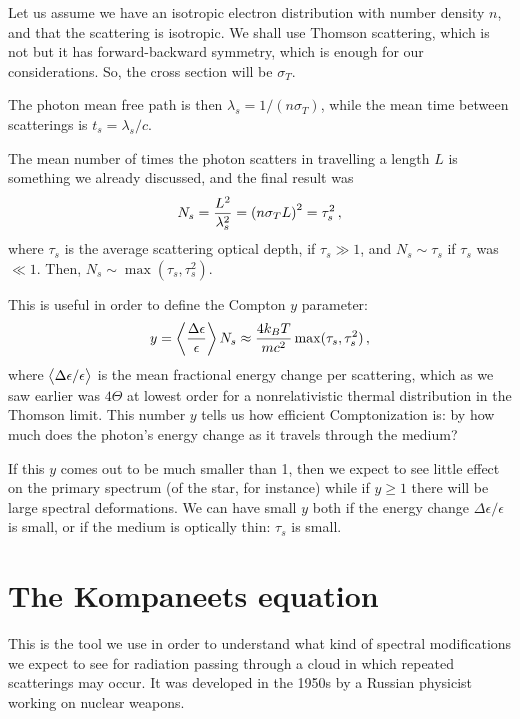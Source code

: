 \documentclass[main.tex]{subfiles}
\begin{document}
Let us assume we have an isotropic electron distribution with number density \(n\), and that the scattering is isotropic. We shall use Thomson scattering, which is not but it has forward-backward symmetry, which is enough for our considerations. So, the cross section will be \(\sigma _T\). 

The photon mean free path is then \(\lambda _s = 1 / (n \sigma _T)\), while the mean time between scatterings is \(t_s = \lambda _s / c\). 

The mean number of times the photon scatters in travelling a length \(L\) is something we already discussed, and the final result was 
%
\begin{align}
N_s = \frac{L^2}{\lambda _s^2} = \qty(n \sigma _T L)^2 = \tau _s^2
\,,
\end{align}
%
where \(\tau _s\) is the average scattering optical depth, if \(\tau _s \gg 1\), and \(N_s \sim \tau _s\) if \(\tau _s\) was \(\ll 1\). Then, \(N_s \sim \max (\tau _s, \tau _s^2)\). 

This is useful in order to define the Compton \(y\) parameter: 
%
\begin{align}
y = \expval{\frac{\Delta \epsilon }{\epsilon }} N_s \approx \frac{4 k_B T}{mc^2 } \max(\tau _s , \tau _s^2)
\,,
\end{align}
%
where \(\expval{\Delta \epsilon / \epsilon }\) is the mean fractional energy change per scattering, which as we saw earlier was \(4 \Theta \) at lowest order for a nonrelativistic thermal distribution in the Thomson  limit. 
This number \(y \) tells us how efficient Comptonization is: by how much does the photon's energy change as it travels through the medium?

If this \(y\) comes out to be much smaller than 1, then we expect to see little effect on the primary spectrum (of the star, for instance) while if \(y \geq 1\)  there will be large spectral deformations. 
We can have small \(y\) both if the energy change \(\Delta \epsilon / \epsilon \) is small, or if the medium is optically thin: \(\tau _s\) is small. 

\section{The Kompaneets equation}

This is the tool we use in order to understand what kind of spectral modifications we expect to see for radiation passing through a cloud in which repeated scatterings may occur. 
It was developed in the 1950s by a Russian physicist working on nuclear weapons. 
\end{document}
